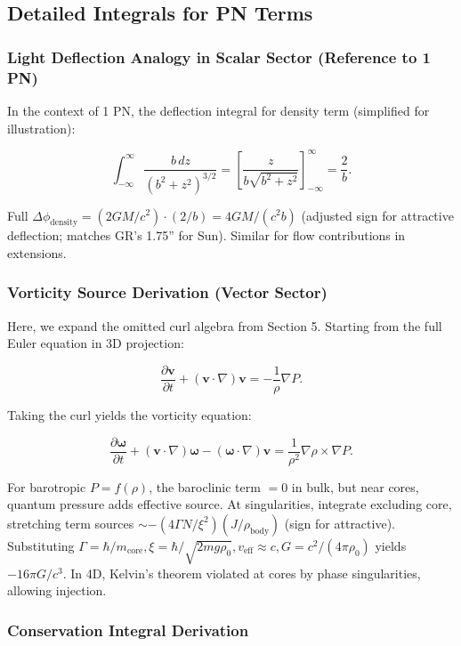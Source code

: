 \documentclass{article}
\begin{document}
\subsection{Detailed Integrals for PN Terms}

\subsubsection{Light Deflection Analogy in Scalar Sector (Reference to 1 PN)}

In the context of 1 PN, the deflection integral for density term (simplified for illustration):

\[
\int_{-\infty}^{\infty} \frac{b \, dz}{(b^2 + z^2)^{3/2}} = \left[ \frac{z}{b \sqrt{b^2 + z^2}} \right]_{-\infty}^{\infty} = \frac{2}{b}.
\]

Full $\Delta \phi_{\text{density}} = (2 GM / c^2) \cdot (2 / b) = 4 GM / (c^2 b)$ (adjusted sign for attractive deflection; matches GR's 1.75'' for Sun). Similar for flow contributions in extensions.

\subsubsection{Vorticity Source Derivation (Vector Sector)}

Here, we expand the omitted curl algebra from Section 5. Starting from the full Euler equation in 3D projection:

\[
\frac{\partial \mathbf{v}}{\partial t} + (\mathbf{v} \cdot \nabla) \mathbf{v} = -\frac{1}{\rho} \nabla P.
\]

Taking the curl yields the vorticity equation:

\[
\frac{\partial \boldsymbol{\omega}}{\partial t} + (\mathbf{v} \cdot \nabla) \boldsymbol{\omega} - (\boldsymbol{\omega} \cdot \nabla) \mathbf{v} = \frac{1}{\rho^2} \nabla \rho \times \nabla P.
\]

For barotropic $P = f(\rho)$, the baroclinic term $=0$ in bulk, but near cores, quantum pressure adds effective source. At singularities, integrate excluding core, stretching term sources $\sim - (4 \Gamma N / \xi^2) (J / \rho_{\text{body}})$ (sign for attractive). Substituting $\Gamma = \hbar / m_{\text{core}}, \xi = \hbar / \sqrt{2 m g \rho_0}, v_{\text{eff}} \approx c, G = c^2 / (4\pi \rho_0)$ yields $-16\pi G / c^3$. In 4D, Kelvin's theorem violated at cores by phase singularities, allowing injection.

\subsubsection{Conservation Integral Derivation}
\end{document}
